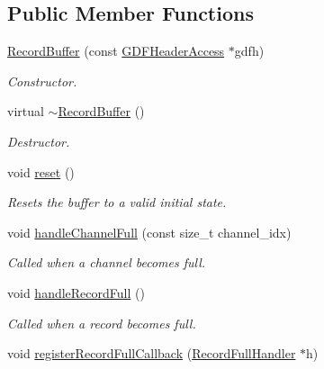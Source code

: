 \subsection*{Public Member Functions}
\begin{DoxyCompactItemize}
\item 
\hypertarget{classgdf_1_1_record_buffer_a81a19745e41216424816d6f5d99d44a3}{
\hyperlink{classgdf_1_1_record_buffer_a81a19745e41216424816d6f5d99d44a3}{RecordBuffer} (const \hyperlink{classgdf_1_1_g_d_f_header_access}{GDFHeaderAccess} $\ast$gdfh)}
\label{classgdf_1_1_record_buffer_a81a19745e41216424816d6f5d99d44a3}

\begin{DoxyCompactList}\small\item\em Constructor. \item\end{DoxyCompactList}\item 
\hypertarget{classgdf_1_1_record_buffer_a4a1ead77698c8ffa21348609f96cac9a}{
virtual \hyperlink{classgdf_1_1_record_buffer_a4a1ead77698c8ffa21348609f96cac9a}{$\sim$RecordBuffer} ()}
\label{classgdf_1_1_record_buffer_a4a1ead77698c8ffa21348609f96cac9a}

\begin{DoxyCompactList}\small\item\em Destructor. \item\end{DoxyCompactList}\item 
\hypertarget{classgdf_1_1_record_buffer_a17d98ebe6d1c41ec7d367e59291697f9}{
void \hyperlink{classgdf_1_1_record_buffer_a17d98ebe6d1c41ec7d367e59291697f9}{reset} ()}
\label{classgdf_1_1_record_buffer_a17d98ebe6d1c41ec7d367e59291697f9}

\begin{DoxyCompactList}\small\item\em Resets the buffer to a valid initial state. \item\end{DoxyCompactList}\item 
void \hyperlink{classgdf_1_1_record_buffer_a7bd44e545daf03030de6e87a7903635a}{handleChannelFull} (const size\_\-t channel\_\-idx)
\begin{DoxyCompactList}\small\item\em Called when a channel becomes full. \item\end{DoxyCompactList}\item 
void \hyperlink{classgdf_1_1_record_buffer_a1ae270e60f9d483a06fe92df0cd664e4}{handleRecordFull} ()
\begin{DoxyCompactList}\small\item\em Called when a record becomes full. \item\end{DoxyCompactList}\item 
\hypertarget{classgdf_1_1_record_buffer_a9de2ad0f9c9020248d52d3ae64137489}{
void \hyperlink{classgdf_1_1_record_buffer_a9de2ad0f9c9020248d52d3ae64137489}{registerRecordFullCallback} (\hyperlink{classgdf_1_1_record_buffer_1_1_record_full_handler}{RecordFullHandler} $\ast$h)}
\label{classgdf_1_1_record_buffer_a9de2ad0f9c9020248d52d3ae64137489}


\end{DoxyCompactItemize}
